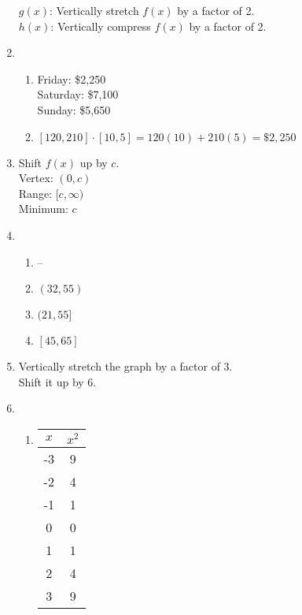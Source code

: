 \documentclass{article}
\begin{document}
\begin{enumerate}
	$g(x)$: Vertically stretch $f(x)$ by a factor of 2. \\
	$h(x)$: Vertically compress $f(x)$ by a factor of 2. 
	
\item

	\begin{enumerate}
	
	\item Friday: \$2,250 \\
		Saturday: \$7,100 \\
		Sunday: \$5,650
		
	\item $[120, 210] \cdot [10,5] = 120(10) + 210(5) = \$2,250$
	
	\end{enumerate}
	
\item Shift $f(x)$ up by $c$. \\
	Vertex: $(0, c)$ \\
	Range: $[c, \infty)$ \\
	Minimum: $c$
	
\item 

	\begin{enumerate}
	
	\item --
	
	\item $(32, 55)$
	
	\item $(21, 55]$
	
	\item $[45, 65]$
	
	\end{enumerate}
	
\item Vertically stretch the graph by a factor of 3. \\
	Shift it up by 6.
	
\item

	\begin{enumerate}
	
	\item

		\begin{tabular}{c | c}
			$x$ & $x^2$ \\
		\hline
		-3 & 9 \\
		-2 & 4 \\
		-1 & 1 \\
		0 & 0 \\
		1 & 1 \\
		2 & 4 \\
		3 & 9
		\end{tabular}
	

\end{enumerate}
\end{enumerate}
\end{document}
